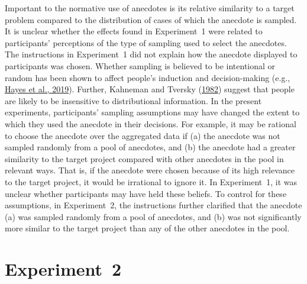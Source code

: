 \documentclass[
  man, donotrepeattitle,floatsintext]{apa7}
\theoremstyle{definition}
\theoremstyle{definition}
\theoremstyle{definition}
\theoremstyle{definition}
\theoremstyle{remark}
\begin{document}
Important to the normative use of anecdotes is its relative similarity to a
target problem compared to the distribution of cases of which the anecdote is
sampled. It is unclear whether the effects found in Experiment~1 were related to
participants' perceptions of the type of sampling used to select the anecdotes.
The instructions in Experiment~1 did not explain how the anecdote displayed to
participants was chosen. Whether sampling is believed to be intentional or
random has been shown to affect people's induction and decision-making (e.g., \protect\hyperlink{ref-hayes2019}{Hayes et al., 2019}). Further, Kahneman and Tversky (\protect\hyperlink{ref-kahneman1982}{1982}) suggest that people are likely
to be insensitive to distributional information. In the present experiments,
participants' sampling assumptions may have changed the extent to which they
used the anecdote in their decisions. For example, it may be rational to choose
the anecdote over the aggregated data if (a) the anecdote was not sampled
randomly from a pool of anecdotes, and (b) the anecdote had a greater similarity
to the target project compared with other anecdotes in the pool in relevant
ways. That is, if the anecdote were chosen because of its high relevance to the
target project, it would be irrational to ignore it. In Experiment~1, it was
unclear whether participants may have held these beliefs. To control for these
assumptions, in Experiment~2, the instructions further clarified that the
anecdote (a) was sampled randomly from a pool of anecdotes, and (b) was not
significantly more similar to the target project than any of the other anecdotes
in the pool.

\hypertarget{anecdotes-2}{%
\section{Experiment~2}\label{anecdotes-2}}
\end{document}

